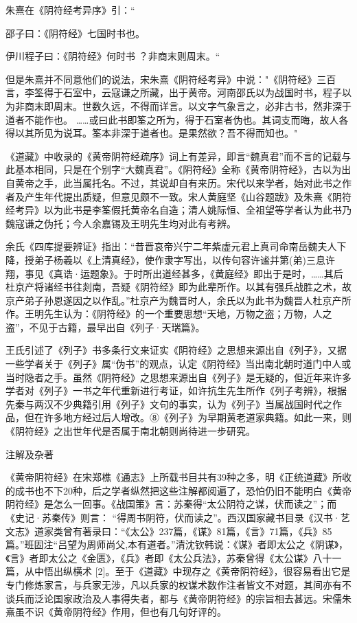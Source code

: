 \documentclass[12pt,UTF8]{ctexbook}
\begin{document}
朱熹在《阴符经考异序》引：“

邵子曰：《阴符经》七国时书也。

伊川程子曰：《阴符经》何时书 ？非商末则周末。“

但是朱熹并不同意他们的说法，宋朱熹《阴符经考异》中说："《阴符经》三百言，李筌得于石室中，云寇谦之所藏，出于黄帝。河南邵氏以为战国时书，程子以为非商末即周末。世数久远，不得而详言。以文字气象言之，必非古书，然非深于道者不能作也。 ……或曰此书即筌之所为，得于石室者伪也。其词支而晦，故人各得以其所见为说耳。筌本非深于道者也。是果然欲？吾不得而知也。"

《道藏》中收录的《黄帝阴符经疏序》词上有差异，即言“魏真君”而不言的记载与此基本相同，只是在个别字“大魏真君”。《阴符经》全称《黄帝阴符经》，古以为出自黄帝之手，此当属托名。不过，其说却自有来历。宋代以来学者，始对此书之作者及产生年代提出质疑，但意见颇不一致。宋人黄庭坚《山谷题跋》及朱熹《阴符经考异》以为此书是李筌假托黄帝名自造；清人姚际恒、全祖望等学者认为此书乃魏寇谦之伪托；今人余嘉锡及王明先生均对此有考辨。

余氏《四库提要辨证》指出：“昔晋哀帝兴宁二年紫虚元君上真司命南岳魏夫人下降，授弟子杨羲以《上清真经》，使作隶字写出，以传句容许谧并第(弟)三息许翔，事见《真诰·运题象》。于时所出道经甚多，《黄庭经》即出于是时，……其后杜京产将诸经书往剡南，吾疑《阴符经》即为此辈所作。以其有强兵战胜之术，故京产弟子孙恩遂因之以作乱。”杜京产为魏晋时人，余氏以为此书为魏晋人杜京产所作。王明先生认为：《阴符经》的一个重要思想“天地，万物之盗；万物，人之盗”，不见于古籍，最早出自《列子·天瑞篇》。

王氏引述了《列子》书多条行文来证实《阴符经》之思想来源出自《列子》，又据一些学者关于《列子》属“伪书”的观点，认定《阴符经》当出南北朝时道门中人或当时隐者之手。虽然《阴符经》之思想来源出自《列子》是无疑的，但近年来许多学者对《列子》一书之年代重新进行考证，如许抗生先生所作《列子考辨》，根据先秦与两汉不少典籍引用《列子》文句的事实，认为《列子》当属战国时代之作品，但在许多地方经过后人增改。⑧《列子》为早期黄老道家典籍。如此一来，则《阴符经》之出世年代是否属于南北朝则尚待进一步研究。

注解及杂著

《黄帝阴符经》在宋郑樵《通志》上所载书目共有39种之多，明《正统道藏》所收的成书也不下20种，后之学者纵然把这些注解都阅遍了，恐怕仍旧不能明白《黄帝阴符经》是怎么一回事。《战国策》言：苏秦得“太公阴符之谋，伏而读之”；而《史记·苏秦传》则言： “得周书阴符，伏而读之”。西汉国家藏书目录《汉书·艺文志》道家类曾有著录曰：“《太公》237篇，《谋》81篇，《言》71篇，《兵》85篇。”班固注“吕望为周师尚父,本有道者。”清沈钦韩说：《谋》者即太公之《阴谋》，《言》者即太公之《金匮》，《兵》者即《太公兵法》，苏秦曾得《太公谋》八十一篇，从中悟出纵横术 [2]。至于《道藏》中现存之《黄帝阴符经》，很容易看出它是专门修炼家言，与兵家无涉，凡以兵家的权谋术数作注者皆文不对题，其间亦有不谈兵而泛论国家政治及人事得失者，都与《黄帝阴符经》的宗旨相去甚远。宋儒朱熹虽不识《黄帝阴符经》作用，但也有几句好评的。
\end{document}
